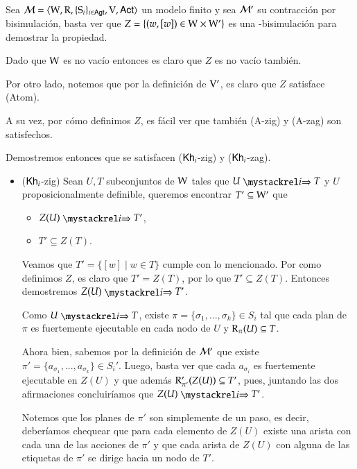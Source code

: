\begin{demostracion}
    Sea $\mathcal{M}=\langle \mathrm{W},\mathrm{R},\{ \mathrm{S}_i \}_{i \in {\rm \sf Agt}},\mathrm{V},{\rm \sf Act} \rangle$ un modelo finito
    y sea $\mathcal{M}'$ su contracción por bisimulación, basta ver que $Z = \{(w,[w]) \in \mathrm{W} \times\mathrm{W}'\}$ es una \KHilogic-bisimulación para demostrar la propiedad.

    Dado que $\mathrm{W}$ es no vacío entonces es claro que $Z$ es no vacío también.

    Por otro lado, notemos que por la definición de $\mathrm{V}'$, es claro que $Z$ satisface (Atom).

    A su vez, por cómo definimos $Z$, es fácil ver que también (A-zig) y (A-zag) son satisfechos.
    
    Demostremos entonces que se satisfacen ($\mathsf{Kh}_i$-zig) y ($\mathsf{Kh}_i$-zag).

    \begin{itemize}
        \item ($\mathsf{Kh}_i$-zig) Sean $U, T$ subconjuntos de $\mathrm{W}$ tales que $U \ultsExecAgi T$ y $U$ proposicionalmente definible, queremos encontrar $T' \subseteq \mathrm{W}'$ que

        \begin{multicols}{2}
            \begin{itemize}
                \item $Z(U) \ultsExecAgi T'$, 
                \item $T' \subseteq Z(T)$.
            \end{itemize}
        \end{multicols}

        Veamos que $T' = \{ [w] \mid w \in T\}$ cumple con lo mencionado. Por como definimos $Z$, es claro que $T'  = Z(T)$, por lo que $T' \subseteq Z(T)$. Entonces demostremos $Z(U) \ultsExecAgi T'$.


        Como $U \ultsExecAgi T$, existe $\pi = \{\sigma_1,...,\sigma_k\} \in S_i$ tal que cada plan de $\pi$ es fuertemente ejecutable en cada nodo de $U$ y $\mathrm{R}_\pi(U) \subseteq T$. 

        Ahora bien, sabemos por la definición de $\mathcal{M}'$ que existe $\pi' =\{a_{\sigma_1},...,a_{\sigma_k}\} \in S_i'$. Luego, basta ver que cada $a_{\sigma_i}$ es fuertemente ejecutable en $Z(U)$ y que además $\mathrm{R}'_{\pi'}(Z(U)) \subseteq T'$, pues, juntando las dos afirmaciones concluiríamos que $Z(U) \ultsExecAgi T'$.


        Notemos que los planes de $\pi'$ son simplemente de un paso, es decir, deberíamos chequear que para cada elemento de $Z(U)$ existe una arista con cada una de las acciones de $\pi'$ y que cada arista de $Z(U)$ con alguna de las etiquetas de $\pi'$ se dirige hacia un nodo de $T'$. 


\end{itemize}
\end{demostracion}
